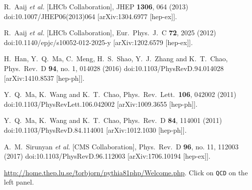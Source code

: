 \documentclass[12pt]{article}
\begin{document}
\begin{thebibliography}{1}
  R.~Aaij {\it et al.} [LHCb Collaboration],
  JHEP {\bf 1306}, 064 (2013)
  doi:10.1007/JHEP06(2013)064
  [arXiv:1304.6977 [hep-ex]].

  R.~Aaij {\it et al.} [LHCb Collaboration],
  Eur.\ Phys.\ J.\ C {\bf 72}, 2025 (2012)
  doi:10.1140/epjc/s10052-012-2025-y
  [arXiv:1202.6579 [hep-ex]].

  H.~Han, Y.~Q.~Ma, C.~Meng, H.~S.~Shao, Y.~J.~Zhang and K.~T.~Chao,
  Phys.\ Rev.\ D {\bf 94}, no. 1, 014028 (2016)
  doi:10.1103/PhysRevD.94.014028
  [arXiv:1410.8537 [hep-ph]].

  Y.~Q.~Ma, K.~Wang and K.~T.~Chao,
  Phys.\ Rev.\ Lett.\  {\bf 106}, 042002 (2011)
  doi:10.1103/PhysRevLett.106.042002
  [arXiv:1009.3655 [hep-ph]].

  Y.~Q.~Ma, K.~Wang and K.~T.~Chao,
  Phys.\ Rev.\ D {\bf 84}, 114001 (2011)
  doi:10.1103/PhysRevD.84.114001
  [arXiv:1012.1030 [hep-ph]].

  A.~M.~Sirunyan {\it et al.} [CMS Collaboration],
  Phys.\ Rev.\ D {\bf 96}, no. 11, 112003 (2017)
  doi:10.1103/PhysRevD.96.112003
  [arXiv:1706.10194 [hep-ex]].

   
\href{http://home.thep.lu.se/\~torbjorn/pythia81php/Welcome.php}
{http://home.thep.lu.se/\~torbjorn/pythia81php/Welcome.php}.  Click on 
{\tt QCD} on the left panel.



  
\end{thebibliography}
  
\end{document}
